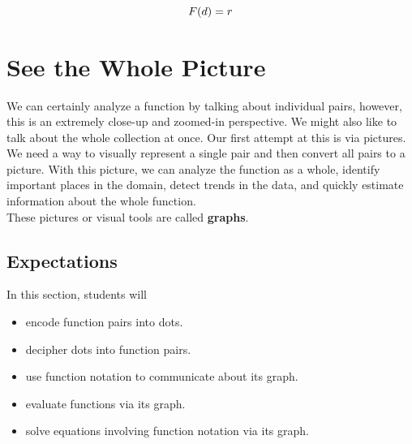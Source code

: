 \documentclass{ximera}
\begin{document}
\[
\large{F(d) = r}
\]


\section{See the Whole Picture}

We can certainly analyze a function by talking about individual pairs, however, this is an extremely close-up and zoomed-in perspective. We might also like to talk about the whole collection at once.  Our first attempt at this is via pictures. We need a way to visually represent a single pair and then convert all pairs to a picture.  With this picture, we can analyze the function as a whole, identify important places in the domain, detect trends in the data, and quickly estimate information about the whole function. \\

These pictures or visual tools are called \textbf{graphs}. \\






\subsection{Expectations}

\begin{sectionOutcomes}
In this section, students will 

\begin{itemize}
\item encode function pairs into dots.
\item decipher dots into function pairs.
\item use function notation to communicate about its graph.
\item evaluate functions via its graph.
\item solve equations involving function notation via its graph.
\end{itemize}
\end{sectionOutcomes}
\end{document}
